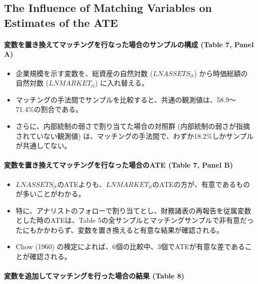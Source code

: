 \subsection*{The Influence of Matching Variables on Estimates of the ATE}

\paragraph{変数を置き換えてマッチングを行なった場合のサンプルの構成 (Table 7, Panel A) }

\begin{itemize}
 \item 企業規模を示す変数を、総資産の自然対数 ($\mathit{LNASSETS}_{it}$) から時価総額の自然対数 ($\mathit{LNMARKET}_{it}$) に入れ替える。
 \item マッチングの手法間でサンプルを比較すると、共通の観測値は、58.9〜71.4\%の割合である。
 \item さらに、内部統制の弱さで割り当てた場合の対照群 (内部統制の弱さが指摘されていない観測値) は、マッチングの手法間で、わずか18.2\%しかサンプルが共通してない。
\end{itemize}

\paragraph{変数を置き換えてマッチングを行なった場合のATE (Table 7, Panel B) }

\begin{itemize}
 \item $\mathit{LNASSETS}_{it}$のATEよりも、$\mathit{LNMARKET}_{it}$のATEの方が、有意であるものが多いことがわかる。
 \item 特に、アナリストのフォローで割り当てとし、財務諸表の再報告を従属変数とした時のATEは、Table 5の全サンプルとマッチングサンプルで非有意だったにもかかわらず、変数を置き換えると有意な結果が確認される。
 \item Chow (1960) の検定によれば、6個の比較中、3個でATEが有意な差であることが確認される。
\end{itemize}

\paragraph{変数を追加してマッチングを行った場合の結果 (Table 8) }


